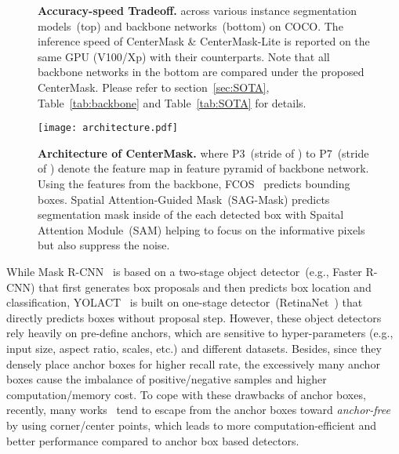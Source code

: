 \documentclass[10pt,twocolumn,letterpaper]{article}
\begin{document}
\begin{figure}[t]
\centering
\caption{\textbf{ Accuracy-speed Tradeoff.} across various instance segmentation models~(top) and backbone networks~(bottom) on COCO.
The inference speed of CenterMask \& CenterMask-Lite is reported on the same GPU (V100/Xp) with their counterparts.
Note that all backbone networks in the bottom are compared under the proposed CenterMask.
Please refer to section~\ref{sec:SOTA}, Table~\ref{tab:backbone} and Table~\ref{tab:SOTA} for details.}
\label{fig:FPS}
\vspace{-0.5cm}
\end{figure}

\begin{figure*}[t]
\centering
   \texttt{[image: architecture.pdf]} 
\caption{\textbf{Architecture of CenterMask.} where P3~(stride of ) to P7~(stride of ) denote the feature map in feature pyramid of backbone network. Using the features from the backbone, FCOS~\cite{Tian_2019_ICCV} predicts bounding boxes. Spatial Attention-Guided Mask~(SAG-Mask) predicts segmentation mask inside of the each detected box with Spaital Attention Module~(SAM) helping to focus on the informative pixels but also suppress the noise.}
\label{fig:architecture}
\vspace{-0.5cm}
\end{figure*}

While Mask R-CNN~\cite{he2017mask} is based on a two-stage object detector~(e.g., Faster R-CNN) that first generates box proposals and then predicts box location and classification, YOLACT~\cite{Bolya_2019_ICCV} is built on one-stage detector~(RetinaNet~\cite{lin2018focal}) that directly predicts boxes without proposal step.
However, these object detectors rely heavily on pre-define anchors, which are sensitive to hyper-parameters (e.g., input size, aspect ratio, scales, etc.) and different datasets. 
Besides, since they densely place anchor boxes for higher recall rate, the excessively many anchor boxes cause the imbalance of positive/negative samples and higher computation/memory cost.
To cope with these drawbacks of anchor boxes, recently, many works~\cite{law2018cornernet,Duan_2019_ICCV,zhou2019objects,zhou2019bottom,Tian_2019_ICCV,zhou2019objects} tend to escape from the anchor boxes toward \textit{anchor-free} by using corner/center points, which leads to more computation-efficient and better performance compared to anchor box based detectors.
\end{document}
